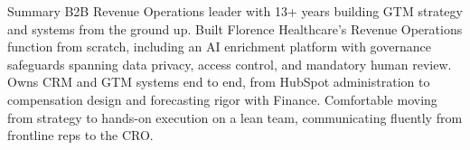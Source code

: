 \documentclass{resume}
\begin{document}
\vspace{-0.15cm}

\begin{rSection}{Summary}
B2B Revenue Operations leader with 13+ years building GTM strategy and systems from the ground up. Built Florence Healthcare's Revenue Operations function from scratch, including an AI enrichment platform with governance safeguards spanning data privacy, access control, and mandatory human review. Owns CRM and GTM systems end to end, from HubSpot administration to compensation design and forecasting rigor with Finance. Comfortable moving from strategy to hands-on execution on a lean team, communicating fluently from frontline reps to the CRO.
\end{rSection}
\vspace{-0.15cm}
\end{document}
